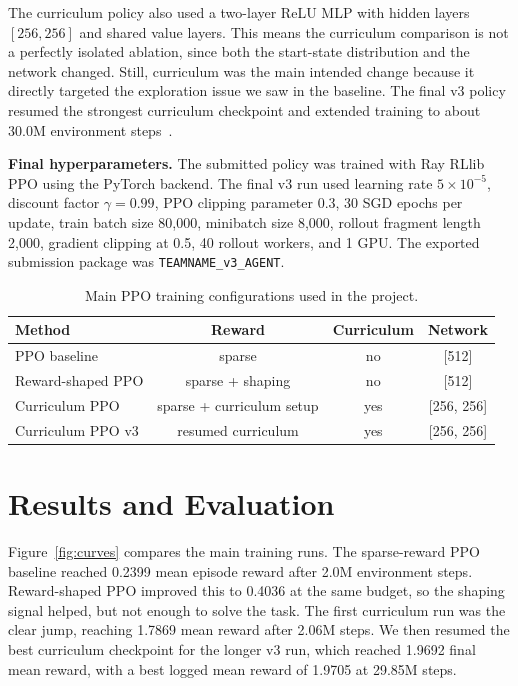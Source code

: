 \documentclass{article}
\begin{document}
The curriculum policy also used a two-layer ReLU MLP with hidden layers \([256,256]\) and shared value layers. This means the curriculum comparison is not a perfectly isolated ablation, since both the start-state distribution and the network changed. Still, curriculum was the main intended change because it directly targeted the exploration issue we saw in the baseline. The final v3 policy resumed the strongest curriculum checkpoint and extended training to about 30.0M environment steps~\citep{bengio2009curriculum}.

\textbf{Final hyperparameters.}
The submitted policy was trained with Ray RLlib PPO using the PyTorch backend. The final v3 run used learning rate \(5\times10^{-5}\), discount factor \(\gamma=0.99\), PPO clipping parameter 0.3, 30 SGD epochs per update, train batch size 80{,}000, minibatch size 8{,}000, rollout fragment length 2{,}000, gradient clipping at 0.5, 40 rollout workers, and 1 GPU. The exported submission package was \texttt{TEAMNAME\_v3\_AGENT}.

\begin{table}[t]
\centering
\small
\caption{Main PPO training configurations used in the project.}
\label{tab:methods}
\begin{tabular}{lccc}
\toprule
Method & Reward & Curriculum & Network \\
\midrule
PPO baseline & sparse & no & [512] \\
Reward-shaped PPO & sparse + shaping & no & [512] \\
Curriculum PPO & sparse + curriculum setup & yes & [256, 256] \\
Curriculum PPO v3 & resumed curriculum & yes & [256, 256] \\
\bottomrule
\end{tabular}
\end{table}





\section{Results and Evaluation}

Figure~\ref{fig:curves} compares the main training runs. The sparse-reward PPO baseline reached 0.2399 mean episode reward after 2.0M environment steps. Reward-shaped PPO improved this to 0.4036 at the same budget, so the shaping signal helped, but not enough to solve the task. The first curriculum run was the clear jump, reaching 1.7869 mean reward after 2.06M steps. We then resumed the best curriculum checkpoint for the longer v3 run, which reached 1.9692 final mean reward, with a best logged mean reward of 1.9705 at 29.85M steps.
\end{document}
